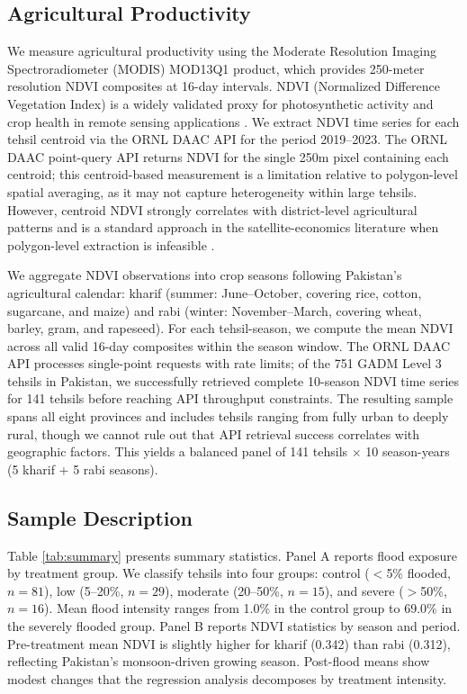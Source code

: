 \documentclass[12pt]{article}
\begin{document}
\subsection{Agricultural Productivity}

We measure agricultural productivity using the Moderate Resolution Imaging Spectroradiometer (MODIS) MOD13Q1 product, which provides 250-meter resolution NDVI composites at 16-day intervals. NDVI (Normalized Difference Vegetation Index) is a widely validated proxy for photosynthetic activity and crop health in remote sensing applications \citep{BurkeLobell2017}. We extract NDVI time series for each tehsil centroid via the ORNL DAAC API for the period 2019--2023. The ORNL DAAC point-query API returns NDVI for the single 250m pixel containing each centroid; this centroid-based measurement is a limitation relative to polygon-level spatial averaging, as it may not capture heterogeneity within large tehsils. However, centroid NDVI strongly correlates with district-level agricultural patterns and is a standard approach in the satellite-economics literature when polygon-level extraction is infeasible \citep{DonaldsonStoreygard2016}.

We aggregate NDVI observations into crop seasons following Pakistan's agricultural calendar: kharif (summer: June--October, covering rice, cotton, sugarcane, and maize) and rabi (winter: November--March, covering wheat, barley, gram, and rapeseed). For each tehsil-season, we compute the mean NDVI across all valid 16-day composites within the season window. The ORNL DAAC API processes single-point requests with rate limits; of the 751 GADM Level 3 tehsils in Pakistan, we successfully retrieved complete 10-season NDVI time series for 141 tehsils before reaching API throughput constraints. The resulting sample spans all eight provinces and includes tehsils ranging from fully urban to deeply rural, though we cannot rule out that API retrieval success correlates with geographic factors. This yields a balanced panel of 141 tehsils $\times$ 10 season-years (5 kharif + 5 rabi seasons).

\subsection{Sample Description}

Table \ref{tab:summary} presents summary statistics. Panel A reports flood exposure by treatment group. We classify tehsils into four groups: control ($<$5\% flooded, $n = 81$), low (5--20\%, $n = 29$), moderate (20--50\%, $n = 15$), and severe ($>$50\%, $n = 16$). Mean flood intensity ranges from 1.0\% in the control group to 69.0\% in the severely flooded group. Panel B reports NDVI statistics by season and period. Pre-treatment mean NDVI is slightly higher for kharif (0.342) than rabi (0.312), reflecting Pakistan's monsoon-driven growing season. Post-flood means show modest changes that the regression analysis decomposes by treatment intensity.
\end{document}
